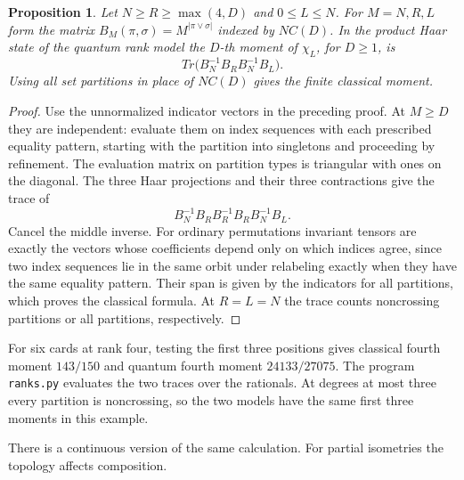 \documentclass[11pt,a4paper]{article}
\newtheorem{prop}[thm]{Proposition}
\begin{document}
\begin{prop}\label{rankgram}
Let $N\geq R\geq\max(4,D)$ and $0\leq L\leq N$. For $M=N,R,L$ form the matrix $B_M(\pi,\sigma)=M^{|\pi\vee\sigma|}$ indexed by $NC(D)$. In the product Haar state of the quantum rank model the $D$-th moment of $\chi_L$, for $D\geq1$, is
\[
 Tr\big(B_N^{-1}B_R B_N^{-1}B_L\big).
\]
Using all set partitions in place of $NC(D)$ gives the finite classical moment.
\end{prop}
\begin{proof}
Use the unnormalized indicator vectors in the preceding proof. At $M\geq D$ they are independent: evaluate them on index sequences with each prescribed equality pattern, starting with the partition into singletons and proceeding by refinement. The evaluation matrix on partition types is triangular with ones on the diagonal. The three Haar projections and their three contractions give the trace of
\[
 B_N^{-1}B_R B_R^{-1}B_R B_N^{-1}B_L.
\]
Cancel the middle inverse. For ordinary permutations invariant tensors are exactly the vectors whose coefficients depend only on which indices agree, since two index sequences lie in the same orbit under relabeling exactly when they have the same equality pattern. Their span is given by the indicators for all partitions, which proves the classical formula. At $R=L=N$ the trace counts noncrossing partitions or all partitions, respectively.
\end{proof}

For six cards at rank four, testing the first three positions gives classical fourth moment $143/150$ and quantum fourth moment $24133/27075$. The program \texttt{ranks.py} evaluates the two traces over the rationals. At degrees at most three every partition is noncrossing, so the two models have the same first three moments in this example.

There is a continuous version of the same calculation. For partial isometries the topology affects composition.
\end{document}
